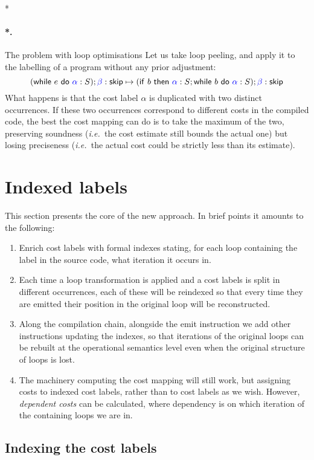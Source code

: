 \documentclass[submission,copyright,creativecommons]{eptcs}
\makeatletter
\theoremstyle{definition}
\newcommand{\s}[1]{{\sf #1}}    \newcommand{\vc}[1]{{\bf #1}}
\newcommand{\sop}[1]{\s{#1}\ }
\newcommand{\sbin}[1]{\ \s{#1}\ }
\newcommand{\ie}{\emph{i.e.\ }}
\def\lbl#1:{\mbox{\color{blue}$#1$}:}
\let\oldparagraph\paragraph
\def\paragraph{\@ifnextchar*\new@paragraph@star\new@paragraph}
\def\new@paragraph@star*#1{\oldparagraph*{#1.}}
\def\new@paragraph#1{\oldparagraph{#1.}}
\makeatother
\begin{document}
\paragraph*{The problem with loop optimisations}
Let us take loop peeling, and apply it to the labelling of a program without any prior adjustment:
$$
(\sop{while}e\sbin{do}\lbl\alpha:S);\lbl\beta:\s{skip}
\mapsto
(\sop{if}b\sbin{then} \lbl\alpha: S; \sop{while} b \sbin{do} \lbl\alpha:
S);
\lbl\beta:\s{skip}
$$
What happens is that the cost label $\alpha$ is duplicated with two distinct occurrences.
If these two occurrences correspond to different costs in the compiled code, the best the cost mapping can do is to take the maximum of the two, preserving soundness (\ie the cost estimate still bounds the actual one) but losing preciseness (\ie the actual cost could be strictly less than its estimate).

\section{Indexed labels}
\label{sec:indexedlabels}
This section presents the core of the new approach.
In brief points it amounts to the following:
\edef\ssec{ssec}
\label{ssec7}\begin{enumerate}[\bfseries\expandafter\ref\expandafter{\expandafter \ssec\arabic{enumi}}.]
\item
Enrich cost labels with formal indexes stating, for each loop containing the label
in the source code, what iteration it occurs in.
\item
Each time a loop transformation is applied and a cost labels is split in different occurrences, each of these will be reindexed so that every time they are emitted their position in the original loop will be reconstructed.
\item
Along the compilation chain, alongside the \s{emit} instruction we add other instructions updating the indexes, so that iterations of the original loops can be rebuilt at the operational semantics level
even when the original structure of loops is lost.
\item
The machinery computing the cost mapping will still work, but assigning costs to indexed cost labels, rather than to cost labels as we wish.
However, \emph{dependent costs} can be calculated, where dependency is on which iteration of the containing loops we are in.
\end{enumerate}

\subsection{Indexing the cost labels}
\label{ssec:indlabs}
\label{ssec1}
\end{document}
